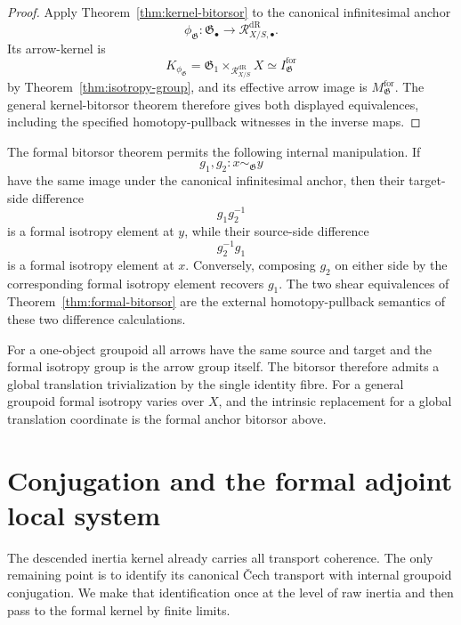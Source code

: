 \begin{proof}
Apply Theorem~\ref{thm:kernel-bitorsor} to the canonical infinitesimal anchor
\[
    \phi_{\mathfrak G}:
    \mathfrak G_\bullet
    \longrightarrow
    \mathcal R^{\mathrm{dR}}_{X/S,\bullet}.
\]
Its arrow-kernel is
\[
    K_{\phi_{\mathfrak G}}
    =
    \mathfrak G_1\times_{\mathcal R^{\mathrm{dR}}_{X/S}}X
    \simeq
    I^{\mathrm{for}}_{\mathfrak G}
\]
by Theorem~\ref{thm:isotropy-group}, and its effective arrow image is
$M^{\mathrm{for}}_{\mathfrak G}$.  The general kernel-bitorsor theorem
therefore gives both displayed equivalences, including the specified
homotopy-pullback witnesses in the inverse maps.
\end{proof}

\begin{remark}
The formal bitorsor theorem permits the following internal manipulation.  If
\[
    g_1,g_2:x\sim_{\mathfrak G}y
\]
have the same image under the canonical infinitesimal anchor, then their
target-side difference
\[
    g_1g_2^{-1}
\]
is a formal isotropy element at $y$, while their source-side difference
\[
    g_2^{-1}g_1
\]
is a formal isotropy element at $x$.  Conversely, composing $g_2$ on either
side by the corresponding formal isotropy element recovers $g_1$.  The two
shear equivalences of Theorem~\ref{thm:formal-bitorsor} are the external
homotopy-pullback semantics of these two difference calculations.
\end{remark}

\begin{remark}
\label{rem:group-case-exceptional}
For a one-object groupoid all arrows have the same source and target and the
formal isotropy group is the arrow group itself.  The bitorsor therefore
admits a global translation trivialization by the single identity fibre.
For a general groupoid formal isotropy varies over $X$, and the intrinsic
replacement for a global translation coordinate is the formal anchor
bitorsor above.
\end{remark}


\section{Conjugation and the formal adjoint local system}
\label{sec:flg-adjoint}

The descended inertia kernel already carries all transport coherence.  The only
remaining point is to identify its canonical \v{C}ech transport with internal
groupoid conjugation.  We make that identification once at the level of raw
inertia and then pass to the formal kernel by finite limits.


